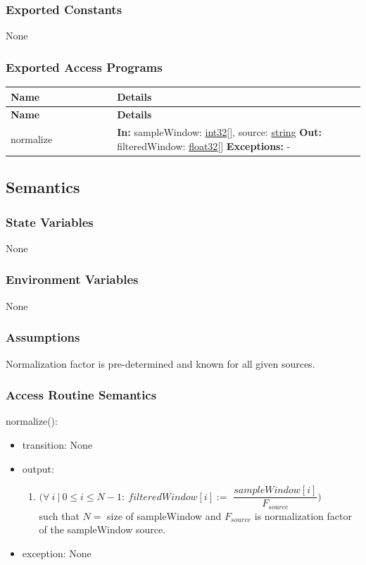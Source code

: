 \documentclass[12pt, titlepage]{article}
\newenvironment{apitable}{%
\begin{center}
\begin{longtable}{|p{0.3\linewidth}|p{0.7\linewidth}|} 
\hline
\textbf{Name} & \textbf{Details} \\
\hline
\endfirsthead
\hline
\textbf{Name} & \textbf{Details} \\
\hline
\endhead
\hline
\endfoot
\hline
\endlastfoot
}{%
\end{longtable}
\end{center}
}
\newcommand{\apifunc}[4]{%
#1 & 
\textbf{In:} #2 \newline
\textbf{Out:} #3 \newline
\textbf{Exceptions:} #4 \\
\hline
}
\begin{document}
\subsubsection{Exported Constants}

None

\subsubsection{Exported Access Programs}
\begin{apitable}
  \apifunc{normalize}
    {sampleWindow: \hyperref[generic:int32]{int32}[],
    source: \hyperref[generic:string]{string}}
    {filteredWindow: \hyperref[generic:float32]{float32}[]}
    {-}
\end{apitable}

\subsection{Semantics}

\subsubsection{State Variables}

None

\subsubsection{Environment Variables}

None

\subsubsection{Assumptions}

Normalization factor is pre-determined and known for all given sources.

\subsubsection{Access Routine Semantics}

\noindent normalize():
\begin{itemize}
\item transition: None
\item output:
  \begin{enumerate}
    \item $(\forall~i~|~0 \leq i \leq N - 1:~filteredWindow[i] := $
    $\dfrac{sampleWindow[i]}{F_{source}})$ \\
    such that $N = $ size of sampleWindow and $F_{source}$ is normalization
    factor of the sampleWindow source.
  \end{enumerate}
\item exception: None
\end{itemize}
\end{document}
